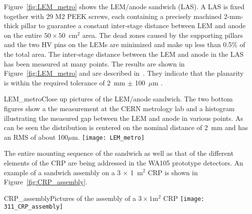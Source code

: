 Figure~\ref{fig:LEM_metro} shows the LEM/anode sandwich (LAS).  A LAS is 
fixed together with 29 M2 PEEK screws, each containing a precisely
machined 2-mm-thick pillar to guarantee a constant inter-stage
distance between LEM and anode on the entire $50\times50$~cm$^2$
area.  The dead zones caused by the supporting pillars and the two HV
pins on the LEMs are minimized and make up less than 0.5\% of the
total area. The inter-stage distance between the LEM and anode in the
LAS has been measured at many points. The results are shown in
Figure~\ref{fig:LEM_metro} and are described
in~\cite{EDMS_metro_lem_anode}. They indicate that the planarity is
within the required tolerance of 2~mm $\pm$ 100~$\mu$m .
\begin{cdrfigure}{LEM_metro}{Close up pictures of the LEM/anode sandwich. The two
       bottom figures show a the measurement at the CERN metrology lab
       and a histogram illustrating the measured gap between the LEM
       and anode in various points. As can be seen the distribution is
       centered on the nominal distance of 2~mm and has an RMS of
       about 100$\mu$m.}
     \texttt{[image: LEM\_metro]}
\end{cdrfigure}

The entire mounting sequence of the sandwich as well as that of the
different elements of the CRP are being addressed in the WA105
prototype detectors. An example of a sandwich assembly on a
3 $\times$ 1~m$^2$ CRP is shown in Figure~\ref{fig:CRP_assembly}.
\begin{cdrfigure}{CRP_assembly}{Pictures of the assembly of a $3\times1$m$^2$ CRP}
     \texttt{[image: 311\_CRP\_assembly]}  
\end{cdrfigure}


